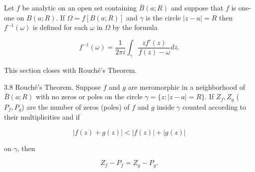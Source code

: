 Let $f$ be analytic on an open set containing $\bar{B}(a; R)$ and suppose that $f$ is one-one on $B(a; R)$. If $\Omega = f[B(a; R)]$ and $\gamma$ is the circle $|z - a| = R$ then $f^{-1}(\omega)$ is defined for each $\omega$ in $\Omega$ by the formula

$$f^{-1}(\omega) = \frac{1}{2\pi i} \int_{\gamma} \frac{zf'(z)}{f(z) - \omega} dz.$$

This section closes with Rouché's Theorem.

3.8 Rouché's Theorem. Suppose $f$ and $g$ are meromorphic in a neighborhood of $\bar{B}(a; R)$ with no zeros or poles on the circle $\gamma = \{z : |z - a| = R\}$. If $Z_f, Z_g$ ($P_f, P_g$) are the number of zeros (poles) of $f$ and $g$ inside $\gamma$ counted according to their multiplicities and if

$$|f(z) + g(z)| < |f(z)| + |g(z)|$$

on $\gamma$, then

$$Z_f - P_f = Z_g - P_g.$$